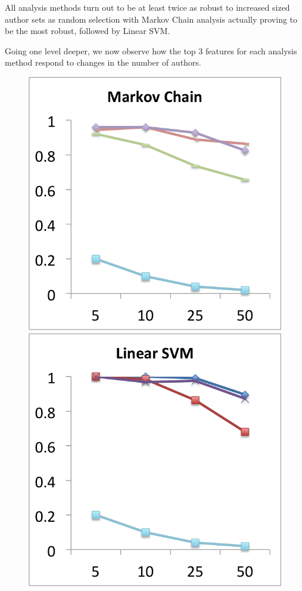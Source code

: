 \documentclass[pageno]{jpaper}
\begin{document}
All analysis methods turn out to be at least twice as robust to increased sized author sets as random selection with Markov Chain analysis actually proving to be the most robust, followed by Linear SVM. 

Going one level deeper, we now observe how the top 3 features for each analysis method respond to changes in the number of authors. 
\begin{figure}[h!]
\begin{center}
\includegraphics*[scale=.5]{Top3Markov}
\includegraphics*[scale=.5]{Top3SVM}

\end{center}
\end{figure}
\end{document}
